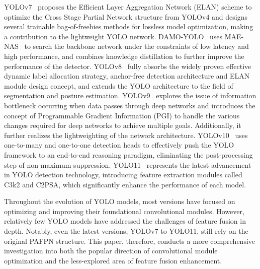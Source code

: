 YOLOv7~\cite{yolov7} proposes the Efficient Layer Aggregation Network (ELAN) scheme to optimize the Cross Stage Partial Network structure from YOLOv4 and designs several trainable bag-of-freebies methods for lossless model optimization, making a contribution to the lightweight YOLO network. 
DAMO-YOLO~\cite{damo} uses MAE-NAS~\cite{maedet} to search the backbone network under the constraints of low latency and high performance, and combines knowledge distillation to further improve the performance of the detector. 
YOLOv8~\cite{yolov8} fully absorbs the widely proven effective dynamic label allocation strategy, anchor-free detection architecture and ELAN module design concept, and extends the YOLO architecture to the field of segmentation and posture estimation. YOLOv9~\cite{yolov9} explores the issue of information bottleneck occurring when data passes through deep networks and introduces the concept of Programmable Gradient Information (PGI) to handle the various changes required for deep networks to achieve multiple goals. Additionally, it further realizes the lightweighting of the network architecture. YOLOv10~\cite{yolov10} uses one-to-many and one-to-one detection heads to effectively push the YOLO framework to an end-to-end reasoning paradigm, eliminating the post-processing step of non-maximum suppression. YOLO11~\cite{yolo11} represents the latest advancement in YOLO detection technology, introducing feature extraction modules called C3k2 and C2PSA, which significantly enhance the performance of each model. 

Throughout the evolution of YOLO models, most versions have focused on optimizing and improving their foundational convolutional modules. However, relatively few YOLO models have addressed the challenges of feature fusion in depth. Notably, even the latest versions, YOLOv7 to YOLO11, still rely on the original PAFPN structure. This paper, therefore, conducts a more comprehensive investigation into both the popular direction of convolutional module optimization and the less-explored area of feature fusion enhancement.

